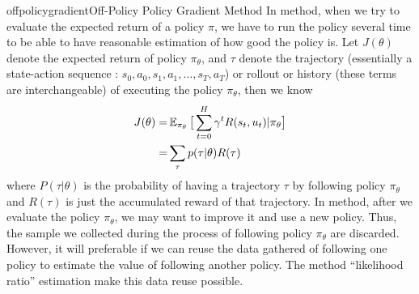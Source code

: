 \documentclass[9pt]{article}
\begin{document}
\begin{topic}{offpolicygradient}{Off-Policy Policy Gradient Method}
In  method, when we try to evaluate the expected return of a policy $\pi$, we have to run the policy several time to be able to have reasonable estimation of how good the policy is. Let $J(\theta)$ denote the expected return of policy $\pi_{\theta}$, and $\tau$ denote the trajectory (essentially a state-action sequence : $s_0, a_0, s_1, a_1, \ldots, s_T, a_T$) or rollout or history (these terms are interchangeable) of executing the policy $\pi_{\theta}$, then we know
\[
\begin{split}
J(\theta) = & \operatorname{\mathbb{E}}_{\pi_{\theta}}\big[\sum_{t=0}^{H}\gamma^tR(s_t,u_t)|\pi_{\theta}\big]\\
= & \sum_{\tau}p(\tau|\theta)R(\tau)
\end{split}
\]
where $P(\tau|\theta)$ is the probability of having a trajectory $\tau$ by following policy $\pi_{\theta}$ and $R(\tau)$ is just the accumulated reward of that trajectory. 
In  method, after we evaluate the policy $\pi_{\theta}$, we may want to improve it and use a new policy. Thus, the sample we collected during the process of following policy $\pi_{\theta}$ are discarded. However, it will preferable if we can reuse the data gathered of following one policy to estimate the value of following another policy. The method ``likelihood ratio'' estimation make this data reuse possible.


\end{topic}
\end{document}
